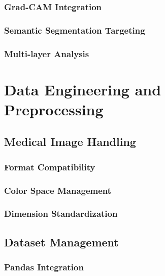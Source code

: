 \documentclass[12pt,a4paper]{report}
\begin{document}
\subsubsection{Grad-CAM Integration}

\subsubsection{Semantic Segmentation Targeting}

\subsubsection{Multi-layer Analysis}

\section{Data Engineering and Preprocessing}

\subsection{Medical Image Handling}

\subsubsection{Format Compatibility}

\subsubsection{Color Space Management}

\subsubsection{Dimension Standardization}

\subsection{Dataset Management}

\subsubsection{Pandas Integration}
\end{document}
